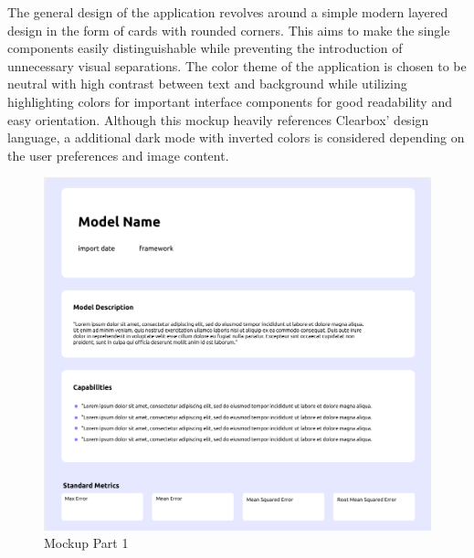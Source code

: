 \documentclass[11pt,a4paper,english]{scrreprt}
\begin{document}
The general design of the application revolves around a simple modern layered design in the form of cards with rounded corners. This aims to make the single components easily distinguishable while preventing the introduction of unnecessary visual separations. The color theme of the application is chosen to be neutral with high contrast between text and background while utilizing highlighting colors for important interface components for good readability and easy orientation. Although this mockup heavily references Clearbox' design language, a additional dark mode with inverted colors is considered depending on the user preferences and image content.

\begin{figure}[htbp]
    \centering
    \includegraphics[width=\textwidth]{img/figures/mockups/mockup_1.png}
    \caption{Mockup Part 1}
    \label{fig:mockup_part_1}
\end{figure}
\end{document}
